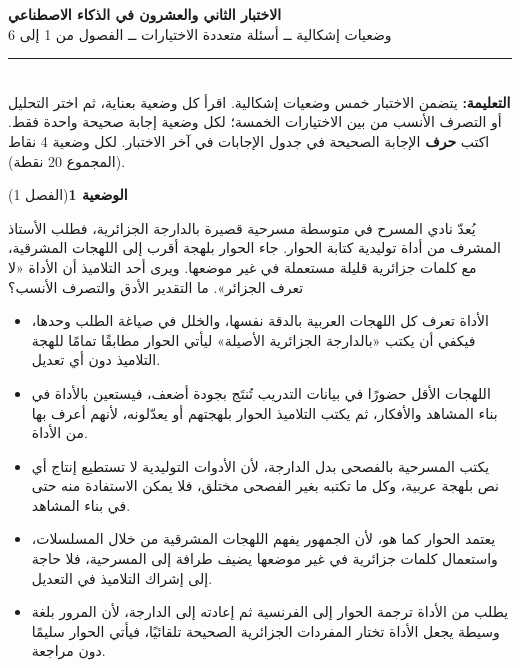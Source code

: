 \documentclass[11pt,a4paper]{article}
\begin{document}
\linespread{1.08}\selectfont
\begin{center}
{\LARGE\khatt\textbf{الاختبار الثاني والعشرون في الذكاء الاصطناعي}}\\[4pt]
{\normalsize وضعيات إشكالية ــ أسئلة متعددة الاختيارات ــ الفصول من 1 إلى 6}
\end{center}
\vspace{-2pt}\rule{\textwidth}{0.6pt}\\[2pt]
\textbf{التعليمة:} يتضمن الاختبار خمس وضعيات إشكالية. اقرأ كل وضعية بعناية، ثم اختر التحليل أو التصرف الأنسب
من بين الاختيارات الخمسة؛ لكل وضعية إجابة صحيحة واحدة فقط.
اكتب \textbf{حرف} الإجابة الصحيحة في جدول الإجابات في آخر الاختبار.
لكل وضعية 4 نقاط (المجموع 20 نقطة).
\vspace{4pt}

\noindent
{\large\khatt\textbf{الوضعية 1}}\hfill{\small(الفصل 1)}\par\nopagebreak\vspace{3pt}
\setlength{\fboxsep}{7pt}\colorbox{gray!10}{\parbox{\dimexpr\linewidth-14pt}{يُعدّ نادي المسرح في متوسطة مسرحية قصيرة بالدارجة الجزائرية، فطلب الأستاذ المشرف من أداة توليدية كتابة الحوار. جاء الحوار بلهجة أقرب إلى اللهجات المشرقية، مع كلمات جزائرية قليلة مستعملة في غير موضعها. ويرى أحد التلاميذ أن الأداة «لا تعرف الجزائر». ما التقدير الأدق والتصرف الأنسب؟}}\par\nopagebreak
\begin{itemize}[leftmargin=1.0cm, labelsep=6pt, itemsep=3pt, topsep=4pt, parsep=0pt]
  \item[\textbf{أ)}] الأداة تعرف كل اللهجات العربية بالدقة نفسها، والخلل في صياغة الطلب وحدها، فيكفي أن يكتب «بالدارجة الجزائرية الأصيلة» ليأتي الحوار مطابقًا تمامًا للهجة التلاميذ دون أي تعديل.
  \item[\textbf{ب)}] اللهجات الأقل حضورًا في بيانات التدريب تُنتَج بجودة أضعف، فيستعين بالأداة في بناء المشاهد والأفكار، ثم يكتب التلاميذ الحوار بلهجتهم أو يعدّلونه، لأنهم أعرف بها من الأداة.
  \item[\textbf{ج)}] يكتب المسرحية بالفصحى بدل الدارجة، لأن الأدوات التوليدية لا تستطيع إنتاج أي نص بلهجة عربية، وكل ما تكتبه بغير الفصحى مختلق، فلا يمكن الاستفادة منه حتى في بناء المشاهد.
  \item[\textbf{د)}] يعتمد الحوار كما هو، لأن الجمهور يفهم اللهجات المشرقية من خلال المسلسلات، واستعمال كلمات جزائرية في غير موضعها يضيف طرافة إلى المسرحية، فلا حاجة إلى إشراك التلاميذ في التعديل.
  \item[\textbf{هـ)}] يطلب من الأداة ترجمة الحوار إلى الفرنسية ثم إعادته إلى الدارجة، لأن المرور بلغة وسيطة يجعل الأداة تختار المفردات الجزائرية الصحيحة تلقائيًا، فيأتي الحوار سليمًا دون مراجعة.
\end{itemize}
\end{document}
